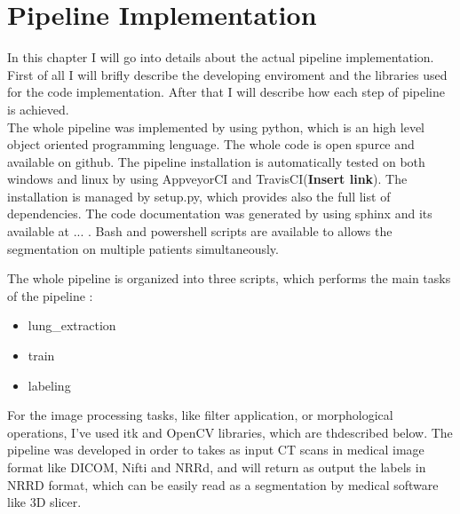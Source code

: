 
	
	\section{Pipeline Implementation}
	
	In this chapter I will go into details about the actual pipeline implementation. First of all I will brifly describe the developing enviroment and the libraries used for the code implementation. After that I will describe how each step of pipeline is achieved.\\
	The whole pipeline was implemented by using python, which is an high level object oriented programming lenguage. The whole code is open spurce and available on github. The pipeline installation is automatically tested on both windows and linux by using AppveyorCI and TravisCI(\textbf{Insert link}).  The installation is managed by setup.py, which provides also the full list of dependencies. The code documentation was generated by using sphinx and its available at ... . Bash and powershell scripts are available to allows the segmentation on multiple patients simultaneously.
	
	The whole pipeline is organized into three scripts, which performs the main tasks of the pipeline : 
	\begin{itemize}
		\item lung\_extraction
		\item train
		\item labeling
	\end{itemize}

	For the image processing tasks, like filter application, or morphological operations, I've used itk and OpenCV libraries, which are thdescribed below. 
	The pipeline was developed in order to takes as input CT scans in medical image format like DICOM, Nifti and NRRd, and will return as output the labels in NRRD format, which can be easily read as a segmentation by medical software like 3D slicer.

